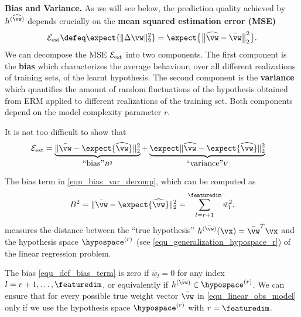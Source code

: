 \documentclass[12pt]{report}
\begin{document}
{\bf Bias and Variance.} 
As we will see below, the prediction quality achieved by $h^{(\widehat{\vw})}$ 
depends crucially on the {\bf mean squared estimation error (MSE)}
\begin{equation}
\label{equ_def_est_err}
\mathcal{E}_{\rm est} \defeq \expect \{  \| \Delta \vw \|^{2}_{2} \} =  \expect \big\{ \big \| \widehat{\vw} - \bar{\vw} \big\|^{2}_{2} \big \}. 
\end{equation}
We can decompose the MSE $\mathcal{E}_{\rm est}$ into two components. 
The first component is the {\bf bias} which characterizes the average behaviour, 
over all different realizations of training sets, of the learnt hypothesis. 
The second component is the {\bf variance} which quantifies the amount of 
random fluctuations of the hypothesis obtained from ERM applied to 
different realizations of the training set. Both components depend on the model 
complexity parameter $r$. 

It is not too difficult to show that 
\vspace*{-1mm}
\begin{align}
\label{equ_bias_var_decomp}
\mathcal{E}_{\rm est} & = \underbrace{ \| \bar{\vw} - \expect \{ \widehat{\vw} \} \|^{2}_{2} }_{\mbox{``bias''} B^2}+ \underbrace{\expect \| \widehat{\vw} - \expect \{ \widehat{\vw} \} \|^{2}_{2}}_{\mbox{``variance''} V} 
\end{align} 

The bias term in \eqref{equ_bias_var_decomp}, which can be computed as 
\vspace*{-3mm}
\begin{equation}
\label{equ_def_bias_term}
B^{2} = \| \bar{\vw} - \expect \{ \widehat{\vw} \} \|^{2}_{2} = \sum_{l=r+1}^{\featuredim} \bar{w}_{l}^2, 
\end{equation} 
measures the distance between the ``true hypothesis'' $h^{(\bar{\vw})}(\vx)=\bar{\vw}^{T} \vx$ 
and the hypothesis space $\hypospace^{(r)}$ (see \eqref{equ_generalization_hypospace_r}) of 
the linear regression problem. 

The bias \eqref{equ_def_bias_term} is zero if $\bar{w}_{l}=0$ for any index 
$l=r+1,\ldots,\featuredim$, or equivalently if $h^{(\bar{\vw})} \in \hypospace^{(r)}$. 
We can ensure that for every possible true weight vector $\bar{\vw}$ in \eqref{equ_linear_obs_model} 
only if we use the hypothesis space $\hypospace^{(r)}$ with $r=\featuredim$. 
\end{document}
